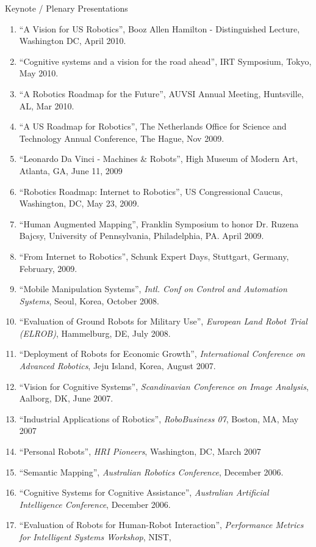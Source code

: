 \documentclass{article}
\begin{document}
\begin{cv}
\begin{cvlist}{Keynote / Plenary Presentations}
\begin{enumerate}
  \item ``A Vision for US Robotics'', Booz Allen Hamilton -  Distinguished Lecture, Washington DC, April 2010.
  \item ``Cognitive systems and a vision for the road ahead'', IRT  Symposium, Tokyo, May 2010.
  \item ``A Robotics Roadmap for the Future'', AUVSI Annual Meeting, Huntsville, AL, Mar 2010.
  \item ``A US Roadmap for Robotics'', The Netherlands Office for Science and Technology Annual Conference, The Hague, Nov 2009.
  \item ``Leonardo Da Vinci - Machines \& Robots'', High Museum of Modern Art, Atlanta, GA, June 11, 2009
  \item ``Robotics Roadmap: Internet to Robotics'', US Congressional Caucus, Washington, DC, May 23, 2009.
  \item ``Human Augmented Mapping'', Franklin Symposium to honor Dr. Ruzena Bajcsy, University of Pennsylvania, Philadelphia,
    PA. April 2009.
  \item ``From Internet to Robotics'', Schunk Expert Days, Stuttgart, Germany, February, 2009.
  \item ``Mobile Manipulation Systems'', {\em Intl. Conf on Control
    and Automation Systems}, Seoul, Korea, October 2008.
  \item ``Evaluation of Ground Robots for Military Use'', {\em
    European Land Robot Trial (ELROB)}, Hammelburg, DE, July 2008.
  \item ``Deployment of Robots for Economic Growth'', {\em
    International Conference on Advanced Robotics}, Jeju Island,
    Korea, August 2007.
  \item ``Vision for Cognitive Systems'', {\em Scandinavian Conference
    on Image Analysis}, Aalborg, DK, June 2007.
  \item ``Industrial Applications of Robotics'', {\em RoboBusiness
    07}, Boston, MA, May 2007
  \item ``Personal Robots'', {\em HRI Pioneers}, Washington, DC, March
    2007
  \item ``Semantic Mapping'', {\em Australian Robotics Conference},
    December 2006.
  \item ``Cognitive Systems for Cognitive Assistance'', {\em
    Australian Artificial Intelligence Conference}, December 2006.
  \item ``Evaluation of Robots for Human-Robot Interaction'', {\em
    Performance Metrics for Intelligent Systems Workshop}, NIST,

\end{enumerate}
\end{cvlist}
\end{cv}
\end{document}
